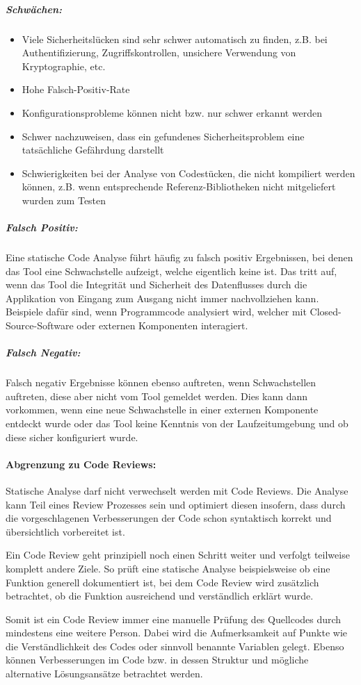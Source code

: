 \subparagraph{Schwächen:}
\begin{itemize}
\item Viele Sicherheitslücken sind sehr schwer automatisch zu finden, z.B. bei Authentifizierung, Zugriffskontrollen, unsichere Verwendung von Kryptographie, etc.
\item Hohe Falsch-Positiv-Rate
\item Konfigurationsprobleme können nicht bzw. nur schwer erkannt werden
\item Schwer nachzuweisen, dass ein gefundenes Sicherheitsproblem eine tatsächliche Gefährdung darstellt
\item Schwierigkeiten bei der Analyse von Codestücken, die nicht kompiliert werden können, z.B. wenn entsprechende Referenz-Bibliotheken nicht mitgeliefert wurden zum Testen
\end{itemize}

\subparagraph{Falsch Positiv:}
Eine statische Code Analyse führt häufig zu falsch positiv Ergebnissen, bei denen das Tool eine Schwachstelle aufzeigt, welche eigentlich keine ist. Das tritt auf, wenn das Tool die Integrität und Sicherheit des Datenflusses durch die Applikation von Eingang zum Ausgang nicht immer nachvollziehen kann. Beispiele dafür sind, wenn Programmcode analysiert wird, welcher mit Closed-Source-Software oder externen Komponenten interagiert.

\subparagraph{Falsch Negativ:}
Falsch negativ Ergebnisse können ebenso auftreten, wenn Schwachstellen auftreten, diese aber nicht vom Tool gemeldet werden. Dies kann dann vorkommen, wenn eine neue Schwachstelle in einer externen Komponente entdeckt wurde oder das Tool keine Kenntnis von der Laufzeitumgebung und ob diese sicher konfiguriert wurde.

\paragraph{Abgrenzung zu Code Reviews:}
Statische Analyse darf nicht verwechselt werden mit Code Reviews. Die Analyse kann Teil eines Review Prozesses sein und optimiert diesen insofern, dass durch die vorgeschlagenen Verbesserungen der Code schon syntaktisch korrekt und übersichtlich vorbereitet ist.

Ein Code Review geht prinzipiell noch einen Schritt weiter und verfolgt teilweise komplett andere Ziele. So prüft eine statische Analyse beispielsweise ob eine Funktion generell dokumentiert ist, bei dem Code Review wird zusätzlich betrachtet, ob die Funktion ausreichend und verständlich erklärt wurde.

Somit ist ein Code Review immer eine manuelle Prüfung des Quellcodes durch mindestens eine weitere Person. Dabei wird die Aufmerksamkeit auf Punkte wie die Verständlichkeit des Codes oder sinnvoll benannte Variablen gelegt. Ebenso können Verbesserungen im Code bzw. in dessen Struktur und mögliche alternative Lösungsansätze betrachtet werden.